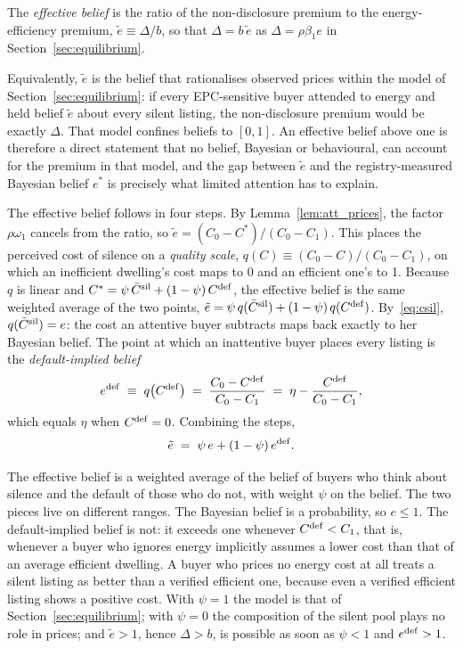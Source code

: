 \begin{definition}
\label{def:effective_belief}
The \emph{effective belief} is the ratio of the non-disclosure premium to the energy-efficiency premium, $\tilde e\equiv\Delta/b$, so that $\Delta=b\,\tilde e$ as $\Delta=\rho\beta_1 e$ in Section~\ref{sec:equilibrium}.
\end{definition}

Equivalently, $\tilde e$ is the belief that rationalises observed prices within the model of Section~\ref{sec:equilibrium}: if every EPC-sensitive buyer attended to energy and held belief $\tilde e$ about every silent listing, the non-disclosure premium would be exactly $\Delta$. That model confines beliefs to $[0,1]$. An effective belief above one is therefore a direct statement that no belief, Bayesian or behavioural, can account for the premium in that model, and the gap between $\tilde e$ and the registry-measured Bayesian belief $e^*$ is precisely what limited attention has to explain.

The effective belief follows in four steps. By Lemma~\ref{lem:att_prices}, the factor $\rho\omega_1$ cancels from the ratio, so $\tilde e=(C_0-C^*)/(C_0-C_1)$. This places the perceived cost of silence on a \emph{quality scale}, $q(C)\equiv(C_0-C)/(C_0-C_1)$, on which an inefficient dwelling's cost maps to 0 and an efficient one's to 1. Because $q$ is linear and $C^*=\psi\,\bar C^{\rm sil}+(1-\psi)\,C^{\rm def}$, the effective belief is the same weighted average of the two points, $\tilde e=\psi\,q(\bar C^{\rm sil})+(1-\psi)\,q(C^{\rm def})$. By~\eqref{eq:csil}, $q(\bar C^{\rm sil})=e$: the cost an attentive buyer subtracts maps back exactly to her Bayesian belief. The point at which an inattentive buyer places every listing is the \emph{default-implied belief}
\begin{equation*}
    e^{\rm def}\;\equiv\;q\big(C^{\rm def}\big)\;=\;\frac{C_0-C^{\rm def}}{C_0-C_1}\;=\;\eta-\frac{C^{\rm def}}{C_0-C_1},
\end{equation*}
which equals $\eta$ when $C^{\rm def}=0$. Combining the steps,
\begin{equation}
    \tilde e\;=\;\psi\,e+(1-\psi)\,e^{\rm def}.
    \label{eq:etilde}
\end{equation}

The effective belief is a weighted average of the belief of buyers who think about silence and the default of those who do not, with weight $\psi$ on the belief. The two pieces live on different ranges. The Bayesian belief is a probability, so $e\le1$. The default-implied belief is not: it exceeds one whenever $C^{\rm def}<C_1$, that is, whenever a buyer who ignores energy implicitly assumes a lower cost than that of an average efficient dwelling. A buyer who prices no energy cost at all treats a silent listing as better than a verified efficient one, because even a verified efficient listing shows a positive cost. With $\psi=1$ the model is that of Section~\ref{sec:equilibrium}; with $\psi=0$ the composition of the silent pool plays no role in prices; and $\tilde e>1$, hence $\Delta>b$, is possible as soon as $\psi<1$ and $e^{\rm def}>1$.


